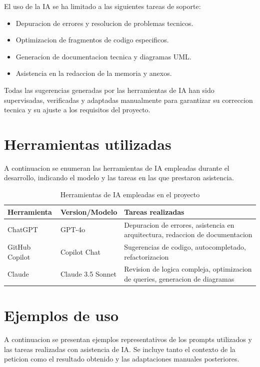 \documentclass[11pt, a4paper]{article}
\begin{document}
El uso de la IA se ha limitado a las siguientes tareas de soporte:

\begin{itemize}
    \item Depuracion de errores y resolucion de problemas tecnicos.
    \item Optimizacion de fragmentos de codigo especificos.
    \item Generacion de documentacion tecnica y diagramas UML.
    \item Asistencia en la redaccion de la memoria y anexos.
\end{itemize}

Todas las sugerencias generadas por las herramientas de IA han sido supervisadas, verificadas y adaptadas manualmente para garantizar su correccion tecnica y su ajuste a los requisitos del proyecto.

\section{Herramientas utilizadas}

A continuacion se enumeran las herramientas de IA empleadas durante el desarrollo, indicando el modelo y las tareas en las que prestaron asistencia.

\begin{table}[H]
\centering
\renewcommand{\arraystretch}{1.4}
\small
\begin{tabular}{|l|l|p{6cm}|}
\hline
\textbf{Herramienta} & \textbf{Version/Modelo} & \textbf{Tareas realizadas} \\
\hline
ChatGPT & GPT-4o & Depuracion de errores, asistencia en arquitectura, redaccion de documentacion \\
\hline
GitHub Copilot & Copilot Chat & Sugerencias de codigo, autocompletado, refactorizacion \\
\hline
Claude & Claude 3.5 Sonnet & Revision de logica compleja, optimizacion de queries, generacion de diagramas \\
\hline
\end{tabular}
\caption{Herramientas de IA empleadas en el proyecto}
\label{tab:ia-herramientas}
\end{table}

\section{Ejemplos de uso}

A continuacion se presentan ejemplos representativos de los prompts utilizados y las tareas realizadas con asistencia de IA. Se incluye tanto el contexto de la peticion como el resultado obtenido y las adaptaciones manuales posteriores.
\end{document}
